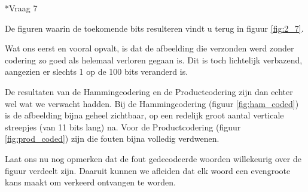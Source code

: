 \documentclass[]{article}
\begin{document}
\begin{section}
\begin{subsection}
    \end{subsection}

    \begin{subsection}*{Vraag 7} %

        De figuren waarin de toekomende bits resulteren vindt u terug
        in figuur \ref{fig:2_7}.

        Wat ons eerst en vooral opvalt, is dat de afbeelding die
        verzonden werd zonder codering zo goed als helemaal verloren
        gegaan is. Dit is toch lichtelijk verbazend, aangezien er
        slechts 1 op de 100 bits veranderd is.

        De resultaten van de Hammingcodering en de Productcodering zijn
        dan echter wel wat we verwacht hadden. Bij de Hammingcodering
        (figuur \ref{fig:ham_coded}) is de afbeelding bijna geheel
        zichtbaar, op een redelijk groot aantal verticale streepjes
        (van 11 bits lang) na. Voor de Productcodering (figuur
        \ref{fig:prod_coded}) zijn die fouten bijna volledig verdwenen.

        Laat ons nu nog opmerken dat de fout gedecodeerde woorden
        willekeurig over de figuur verdeelt zijn. Daaruit kunnen we
        afleiden dat elk woord een evengroote kans maakt om verkeerd
        ontvangen te worden.

        \begin{figure}
            \centering


\end{figure}
\end{subsection}
\end{section}
\end{document}
